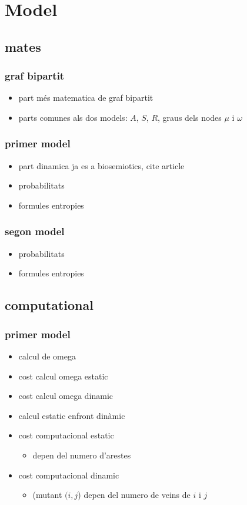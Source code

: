 \chapter{Model}
\section{mates}
\subsection{graf bipartit}
\begin{itemize}
\item part més matematica de graf bipartit
\item parts comunes als dos models: $A$, $S$, $R$, graus dels nodes $\mu$ i
  $\omega$
\end{itemize}
\subsection{primer model}
\begin{itemize}
\item part dinamica ja es a biosemiotics, cite article
\item probabilitats
\item formules entropies
\end{itemize}
\subsection{segon model}
\begin{itemize}
\item probabilitats
\item formules entropies
\end{itemize}
\section{computational}
\subsection{primer model}
\begin{itemize}
\item calcul de omega
\item cost calcul omega estatic
\item cost calcul omega dinamic
\item calcul estatic enfront dinàmic
\item cost computacional estatic
  \begin{itemize}
  \item depen del numero d'arestes
  \end{itemize}
\item cost computacional dinamic
  \begin{itemize}
  \item (mutant $(i,j$) depen del numero de veins de $i$ i $j$
  \end{itemize}
\end{itemize}
